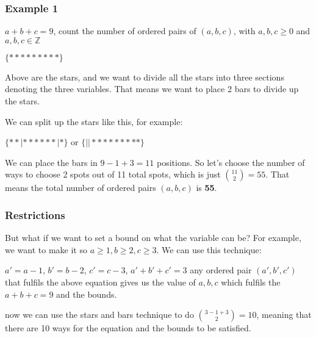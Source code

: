 \documentclass{article}
\begin{document}
\subsubsection{Example 1}
$a + b + c = 9$, count the number of ordered pairs of 
$(a, b, c)$, with $a, b, c \geq 0$ and $a, b, c \in \mathbb{Z}$

\begin{center}
    $\{*********\}$ 
\end{center}

Above are the stars, and we want to divide all the 
stars into three sections denoting the three variables. 
That means we want to place 2 bars to divide up the stars.

\begin{center}
We can split up the stars like this, for example:

$\{**|******|*\}$ or $\{||*********\}$
\end{center}
    
We can place the bars in $9 - 1 + 3 = 11$ positions.
So let's choose the number of ways to choose 2 spots out of 
11 total spots, which is just $\binom{11}{2} = 55$. That means 
the total number of ordered pairs $(a, b, c)$ is \textbf{55}.

\subsubsection{Restrictions}
But what if we want to set a bound on what the variable can be?
For example, we want to make it so $a \geq 1, b \geq 2, c \geq 3$.
We can use this technique: 
\begin{center}
$a' = a - 1$,
$b' = b - 2$,
$c' = c - 3$,
$a' + b' + c' = 3$
any ordered pair $(a', b', c')$ that fulfils the above equation
gives us the value of $a, b, c$ which fulfils the $a + b + c = 9$
and the bounds.
\end{center}
now we can use the stars and bars technique to do 
$\binom{3 - 1 + 3}{2} = 10$, meaning that there are 10 ways
for the equation and the bounds to be satisfied.
\end{document}
